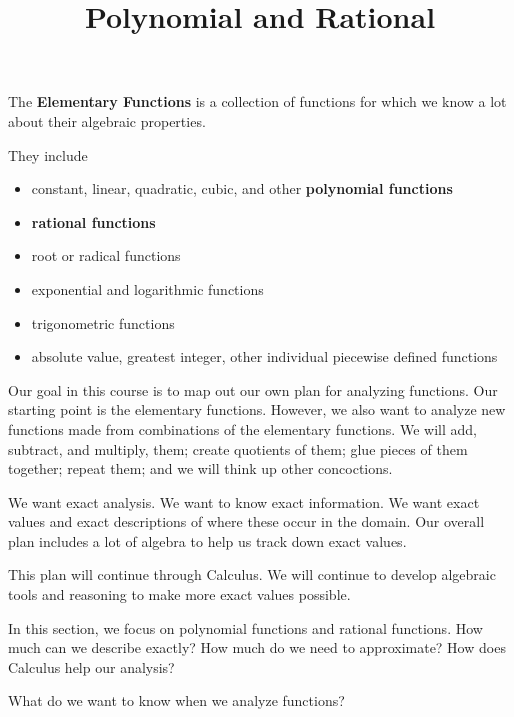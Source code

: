 \documentclass{ximera}
\title{Polynomial and Rational}
\begin{document}
\begin{abstract}
\end{abstract}
\maketitle




The \textbf{Elementary Functions} is a collection of functions for which we know a lot about their algebraic properties.

They include 

\begin{itemize}
\item constant, linear, quadratic, cubic, and other \textbf{\textcolor{purple!85!blue}{polynomial functions}}
\item \textbf{\textcolor{purple!85!blue}{rational functions}}
\item root or radical functions
\item exponential and logarithmic functions
\item trigonometric functions
\item absolute value, greatest integer, other individual piecewise defined functions
\end{itemize}








Our goal in this course is to map out our own plan for analyzing functions.  Our starting point is the elementary functions. However, we also want to analyze new functions made from combinations of the elementary functions.  We will add, subtract, and multiply, them; create quotients of them; glue pieces of them together; repeat them; and we will think up other concoctions.

We want exact analysis.  We want to know exact information.  We want exact values and exact descriptions of where these occur in the domain. Our overall plan includes a lot of algebra to help us track down exact values.  


This plan will continue through Calculus.  We will continue to develop algebraic tools and reasoning to make more exact values possible.

In this section, we focus on polynomial functions and rational functions.  How much can we describe exactly? How much do we need to approximate? How does Calculus help our analysis?


What do we want to know when we analyze functions?
\end{document}

